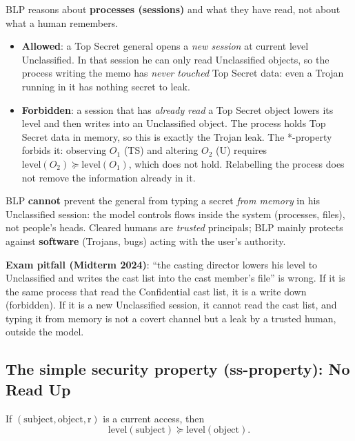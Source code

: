 \begin{remark}
BLP reasons about \textbf{processes (sessions)} and what they have read, not about what a human remembers.
\begin{itemize}
    \item \textbf{Allowed}: a Top Secret general opens a \emph{new session} at current level Unclassified. In that session he can only read Unclassified objects, so the process writing the memo has \emph{never touched} Top Secret data: even a Trojan running in it has nothing secret to leak.
    \item \textbf{Forbidden}: a session that has \emph{already read} a Top Secret object lowers its level and then writes into an Unclassified object. The process holds Top Secret data in memory, so this is exactly the Trojan leak. The *-property forbids it: observing $O_1$ (TS) and altering $O_2$ (U) requires $\text{level}(O_2) \succeq \text{level}(O_1)$, which does not hold. Relabelling the process does not remove the information already in it.
\end{itemize}
BLP \textbf{cannot} prevent the general from typing a secret \emph{from memory} in his Unclassified session: the model controls flows inside the system (processes, files), not people's heads. Cleared humans are \emph{trusted} principals; BLP mainly protects against \textbf{software} (Trojans, bugs) acting with the user's authority.

\textbf{Exam pitfall (Midterm 2024)}: ``the casting director lowers his level to Unclassified and writes the cast list into the cast member's file'' is wrong. If it is the same process that read the Confidential cast list, it is a write down (forbidden). If it is a new Unclassified session, it cannot read the cast list, and typing it from memory is not a covert channel but a leak by a trusted human, outside the model.
\end{remark}

\subsection{The simple security property (ss-property): No Read Up}

\begin{definition}
If $(\text{subject}, \text{object}, \text{r})$ is a current access, then
\[
\text{level}(\text{subject}) \succeq \text{level}(\text{object}).
\]
\end{definition}


